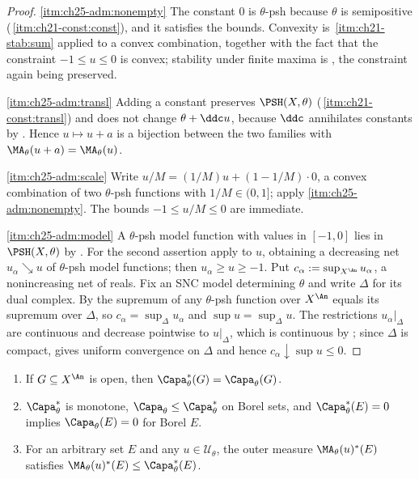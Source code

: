 \begin{proof}
\cref{itm:ch25-adm:nonempty}  The constant \(0\) is \(\theta\)-psh because
\(\theta\) is semipositive
(\,\cref{itm:ch21-const:const}), and it satisfies
the bounds.  Convexity is
\,\cref{itm:ch21-stab:sum} applied to a convex
combination, together with the fact that the constraint \(-1\leq u\leq0\) is
convex; stability under finite maxima is
, the constraint again being preserved.

\cref{itm:ch25-adm:transl}  Adding a constant preserves \(\PSH(X,\theta)\)
(\,\cref{itm:ch21-const:transl}) and does not change
\(\theta+\ddc u\), because \(\ddc\) annihilates constants by
.  Hence \(u\mapsto u+a\) is a bijection between the two
families with \(\MA_\theta(u+a)=\MA_\theta(u)\).

\cref{itm:ch25-adm:scale}  Write \(u/M=(1/M)u+(1-1/M)\cdot0\), a convex
combination of two \(\theta\)-psh functions with \(1/M\in(0,1]\); apply
\cref{itm:ch25-adm:nonempty}.  The bounds \(-1\leq u/M\leq0\) are immediate.

\cref{itm:ch25-adm:model}  A \(\theta\)-psh model function with values in
\([-1,0]\) lies in \(\PSH(X,\theta)\) by
.  For the second assertion apply
 to \(u\), obtaining a decreasing net
\(u_\alpha\searrow u\) of \(\theta\)-psh model functions; then
\(u_\alpha\geq u\geq-1\).  Put \(c_\alpha:=\sup_{X^{\An}}u_\alpha\), a
nonincreasing net of reals.  Fix an SNC model determining \(\theta\) and
write \(\Delta\) for its dual complex.  By
 the supremum of any \(\theta\)-psh function
over \(X^{\An}\) equals its supremum over \(\Delta\), so
\(c_\alpha=\sup_\Delta u_\alpha\) and \(\sup u=\sup_\Delta u\).  The
restrictions \(u_\alpha|_\Delta\) are continuous and decrease pointwise to
\(u|_\Delta\), which is continuous by
; since \(\Delta\) is compact,
 gives uniform convergence on \(\Delta\) and hence
\(c_\alpha\downarrow\sup u\leq0\).
\end{proof}

\begin{lemma}
\label{lem:ch25-inner-outer}
\begin{enumerate}
\item\label{itm:ch25-io:open}
 If \(G\subseteq X^{\An}\) is open, then
 \(\Capa_\theta^*(G)=\Capa_\theta(G)\).
\item\label{itm:ch25-io:mono}
 \(\Capa_\theta^*\) is monotone, \(\Capa_\theta\leq\Capa_\theta^*\) on Borel
 sets, and \(\Capa^*_\theta(E)=0\) implies \(\Capa_\theta(E)=0\) for Borel
 \(E\).
\item\label{itm:ch25-io:radon}
 For an arbitrary set \(E\) and any \(u\in\mathcal U_\theta\), the outer
 measure \(\MA_\theta(u)^*(E)\) satisfies
 \(\MA_\theta(u)^*(E)\leq\Capa^*_\theta(E)\).
\end{enumerate}
\end{lemma}

